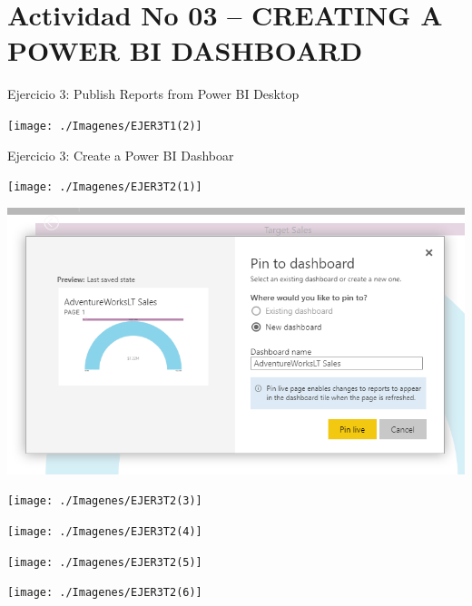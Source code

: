 \section{Actividad No 03 –  CREATING A POWER BI DASHBOARD} 

Ejercicio 3: Publish Reports from Power BI Desktop \\


	

	\begin{center}
	\texttt{[image: ./Imagenes/EJER3T1(2)]}
	\end{center}
\newpage	
Ejercicio 3: Create a Power BI Dashboar \\
	\begin{center}
	\texttt{[image: ./Imagenes/EJER3T2(1)]}
	\end{center}	

	\begin{center}
	\includegraphics[width=18cm]{./Imagenes/EJER3T2(2)}
	\end{center}	

	\begin{center}
	\texttt{[image: ./Imagenes/EJER3T2(3)]}
	\end{center}	

	\begin{center}
	\texttt{[image: ./Imagenes/EJER3T2(4)]}
	\end{center}	

	\begin{center}
	\texttt{[image: ./Imagenes/EJER3T2(5)]}
	\end{center}	

	\begin{center}
	\texttt{[image: ./Imagenes/EJER3T2(6)]}
	\end{center}	
